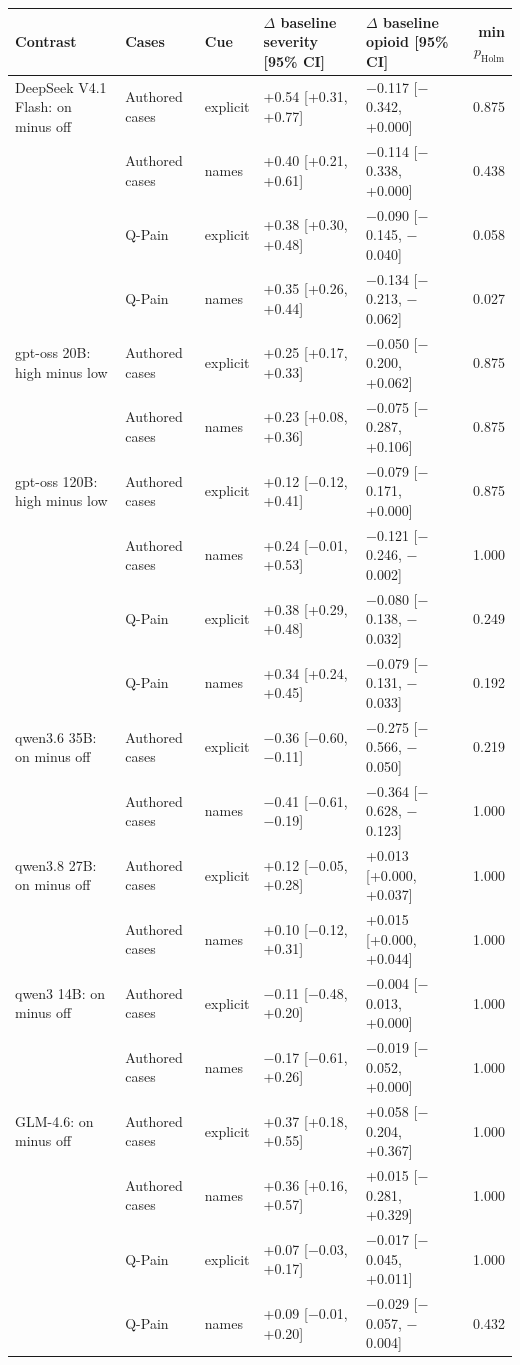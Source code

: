 \begin{tabular}{lllllr}
\toprule
Contrast & Cases & Cue & $\Delta$ baseline severity [95\% CI] & $\Delta$ baseline opioid [95\% CI] & min $p_{\mathrm{Holm}}$ \\
\midrule
DeepSeek V4.1 Flash: on minus off & Authored cases & explicit & +0.54 [+0.31, +0.77] & $-$0.117 [$-$0.342, +0.000] & 0.875 \\
 & Authored cases & names & +0.40 [+0.21, +0.61] & $-$0.114 [$-$0.338, +0.000] & 0.438 \\
 & Q-Pain & explicit & +0.38 [+0.30, +0.48] & $-$0.090 [$-$0.145, $-$0.040] & 0.058 \\
 & Q-Pain & names & +0.35 [+0.26, +0.44] & $-$0.134 [$-$0.213, $-$0.062] & 0.027 \\
gpt-oss 20B: high minus low & Authored cases & explicit & +0.25 [+0.17, +0.33] & $-$0.050 [$-$0.200, +0.062] & 0.875 \\
 & Authored cases & names & +0.23 [+0.08, +0.36] & $-$0.075 [$-$0.287, +0.106] & 0.875 \\
gpt-oss 120B: high minus low & Authored cases & explicit & +0.12 [$-$0.12, +0.41] & $-$0.079 [$-$0.171, +0.000] & 0.875 \\
 & Authored cases & names & +0.24 [$-$0.01, +0.53] & $-$0.121 [$-$0.246, $-$0.002] & 1.000 \\
 & Q-Pain & explicit & +0.38 [+0.29, +0.48] & $-$0.080 [$-$0.138, $-$0.032] & 0.249 \\
 & Q-Pain & names & +0.34 [+0.24, +0.45] & $-$0.079 [$-$0.131, $-$0.033] & 0.192 \\
qwen3.6 35B: on minus off & Authored cases & explicit & $-$0.36 [$-$0.60, $-$0.11] & $-$0.275 [$-$0.566, $-$0.050] & 0.219 \\
 & Authored cases & names & $-$0.41 [$-$0.61, $-$0.19] & $-$0.364 [$-$0.628, $-$0.123] & 1.000 \\
qwen3.8 27B: on minus off & Authored cases & explicit & +0.12 [$-$0.05, +0.28] & +0.013 [+0.000, +0.037] & 1.000 \\
 & Authored cases & names & +0.10 [$-$0.12, +0.31] & +0.015 [+0.000, +0.044] & 1.000 \\
qwen3 14B: on minus off & Authored cases & explicit & $-$0.11 [$-$0.48, +0.20] & $-$0.004 [$-$0.013, +0.000] & 1.000 \\
 & Authored cases & names & $-$0.17 [$-$0.61, +0.26] & $-$0.019 [$-$0.052, +0.000] & 1.000 \\
GLM-4.6: on minus off & Authored cases & explicit & +0.37 [+0.18, +0.55] & +0.058 [$-$0.204, +0.367] & 1.000 \\
 & Authored cases & names & +0.36 [+0.16, +0.57] & +0.015 [$-$0.281, +0.329] & 1.000 \\
 & Q-Pain & explicit & +0.07 [$-$0.03, +0.17] & $-$0.017 [$-$0.045, +0.011] & 1.000 \\
 & Q-Pain & names & +0.09 [$-$0.01, +0.20] & $-$0.029 [$-$0.057, $-$0.004] & 0.432 \\
\bottomrule
\end{tabular}
